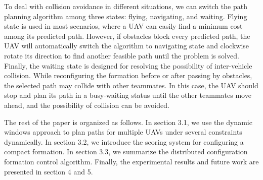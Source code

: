 To deal with collision avoidance in different situations, we can switch the path planning algorithm among three states: flying, navigating, and waiting. Flying state is used in most scenarios, where a UAV can easily find a minimum cost among its predicted path. However, if obstacles block every predicted path, the UAV will automatically switch the algorithm to navigating state and clockwise rotate its direction to find another feasible path until the problem is solved. Finally, the waiting state is designed for resolving the possibility of inter-vehicle collision. While reconfiguring the formation before or after passing by obstacles, the selected path may collide with other teammates. In this case, the UAV should stop and plan its path in a busy-waiting status until the other teammates move ahead, and the possibility of collision can be avoided.

The rest of the paper is organized as follows. In section 3.1, we use the dynamic windows approach \citep{580977} to plan paths for multiple UAVs under several constraints dynamically. In section 3.2, we introduce the scoring system for configuring a compact formation. In section 3.3, we summarize the distributed configuration formation control algorithm. Finally, the experimental results and future work are presented in section 4 and 5.
